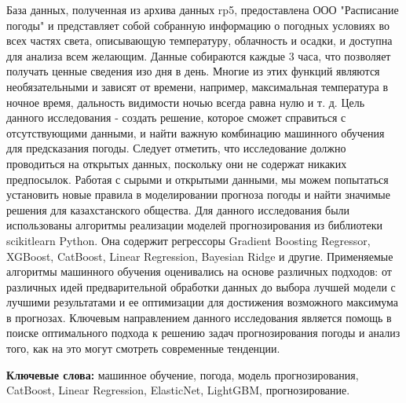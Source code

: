 База данных, полученная из архива данных rp5, предоставлена ООО
"Расписание погоды" и представляет собой собранную информацию о погодных
условиях во всех частях света, описывающую температуру, облачность и
осадки, и доступна для анализа всем желающим. Данные собираются каждые 3
часа, что позволяет получать ценные сведения изо дня в день. Многие из
этих функций являются необязательными и зависят от времени, например,
максимальная температура в ночное время, дальность видимости ночью
всегда равна нулю и т. д. Цель данного исследования - создать решение,
которое сможет справиться с отсутствующими данными, и найти важную
комбинацию машинного обучения для предсказания погоды. Следует отметить,
что исследование должно проводиться на открытых данных, поскольку они не
содержат никаких предпосылок. Работая с сырыми и открытыми данными, мы
можем попытаться установить новые правила в моделировании прогноза
погоды и найти значимые решения для казахстанского общества. Для данного
исследования были использованы алгоритмы реализации моделей
прогнозирования из библиотеки scikitlearn Python. Она содержит
регрессоры Gradient Boosting Regressor, XGBoost, CatBoost, Linear
Regression, Bayesian Ridge и другие. Применяемые алгоритмы машинного
обучения оценивались на основе различных подходов: от различных идей
предварительной обработки данных до выбора лучшей модели с лучшими
результатами и ее оптимизации для достижения возможного максимума в
прогнозах. Ключевым направлением данного исследования является помощь в
поиске оптимального подхода к решению задач прогнозирования погоды и
анализ того, как на это могут смотреть современные тенденции.

\textbf{Ключевые слова:} машинное обучение, погода, модель
прогнозирования, CatBoost, Linear Regression, ElasticNet, LightGBM,
прогнозирование.

